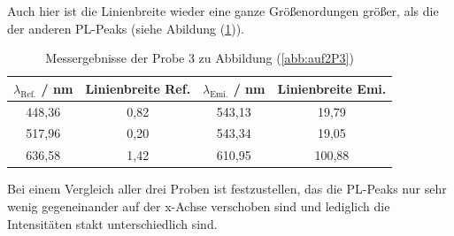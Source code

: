 Auch hier ist die Linienbreite wieder eine ganze Gr\"{o}{\ss}enordungen gr\"{o}{\ss}er, als die der anderen PL-Peaks (siehe Abildung (\ref{tab:auf2c})).
\begin{table}
	\centering
	\caption{Messergebnisse der Probe 3 zu Abbildung (\ref{abb:auf2P3})}
\begin{tabular}{|cccc|}
	\hline
	{$\lambda_{\text{Ref.}}$ / nm}	&	{Linienbreite Ref.}	&	{$\lambda_{\text{Emi.}}$ / nm}	&	{Linienbreite Emi.}	\\
	\hline
	448,36 & 0,82 & 543,13 & 19,79 \\
	517,96 & 0,20 & 543,34 & 19,05 \\
	636,58 & 1,42 & 610,95 & 100,88 \\
	\hline
	\end{tabular}
\label{tab:auf2c}
\end{table}

Bei einem Vergleich aller drei Proben ist festzustellen, das die PL-Peaks nur sehr wenig gegeneinander auf der x-Achse verschoben sind und lediglich die Intensit\"{a}ten stakt unterschiedlich sind.

